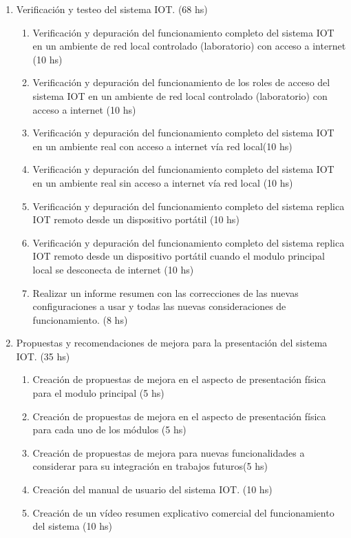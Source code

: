 \documentclass[11pt]{charter}
\begin{document}
\begin{enumerate}
\begin{enumerate}
	\end{enumerate}
\item Verificación y testeo del sistema IOT. (68 hs)
	\begin{enumerate}
	\item Verificación y depuración del funcionamiento completo del sistema IOT en un ambiente de red local controlado (laboratorio) con acceso a internet (10 hs)
	\item Verificación y depuración del funcionamiento de los roles de acceso del sistema IOT en un ambiente de red local controlado (laboratorio) con acceso a internet (10 hs) 
	\item Verificación y depuración del funcionamiento completo del sistema IOT en un ambiente real con acceso a internet vía red local(10 hs) 
	\item Verificación y depuración del funcionamiento completo del sistema IOT en un ambiente real sin acceso a internet vía red local (10 hs) 
	\item Verificación y depuración del funcionamiento completo del sistema replica IOT remoto desde un dispositivo portátil (10 hs)
	\item Verificación y depuración del funcionamiento completo del sistema replica IOT remoto desde un dispositivo portátil cuando el modulo principal local se desconecta de internet (10 hs)
	\item Realizar un informe resumen con las correcciones de las nuevas configuraciones a usar y todas las nuevas consideraciones de funcionamiento. (8 hs)
	\end{enumerate}
\item Propuestas y recomendaciones de mejora para la presentación del sistema IOT. (35 hs)
	\begin{enumerate}
	\item Creación de propuestas de mejora en el aspecto de presentación física para el modulo principal (5 hs)
	\item Creación de propuestas de mejora en el aspecto de presentación física para cada uno de los módulos (5 hs)
	\item Creación de propuestas de mejora para nuevas funcionalidades a considerar para su integración en trabajos futuros(5 hs)
	\item Creación del manual de usuario del sistema IOT. (10 hs)
	\item Creación de un vídeo resumen explicativo comercial del funcionamiento del sistema (10 hs)
	\end{enumerate}	
		
\end{enumerate}
\end{document}
